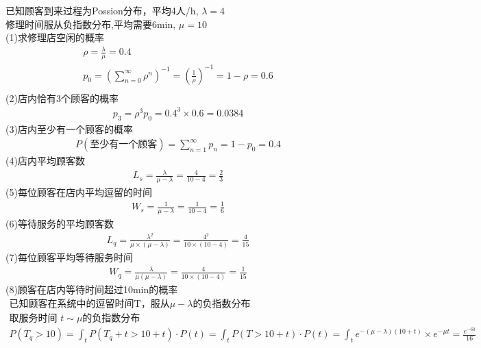 \documentclass{article}
\begin{document}
    已知顾客到来过程为Possion分布，平均4人/h, $\lambda = 4$\\
    修理时间服从负指数分布,平均需要6min, $\mu = 10$\\
    (1)求修理店空闲的概率\\
    \begin{gather*}
        \rho = \frac{\lambda}{\mu} = 0.4\\
        p_0 = \left(\sum_{n=0}^\infty \rho^n\right)^{-1} 
    = \left(\frac{1}{\rho}\right)^{-1}
    = 1-\rho = 0.6\\
    \end{gather*}
    (2)店内恰有3个顾客的概率\\
    \begin{gather*}
        p_3 = \rho^3 p_0 = 0.4^3 \times 0.6 = 0.0384
    \end{gather*}
    (3)店内至少有一个顾客的概率\\
    \begin{gather*}
        P(\text{至少有一个顾客})= \sum_{n=1}^{\infty} p_n = 1- p_0 = 0.4
    \end{gather*}
    (4)店内平均顾客数\\
    \begin{gather*}
        L_s = \frac{\lambda}{\mu - \lambda}
    = \frac{4}{10 - 4} = \frac{2}{3} 
    \end{gather*}
    (5)每位顾客在店内平均逗留的时间\\
    \begin{gather*}
        W_s = \frac{1}{\mu - \lambda}
    = \frac{1}{10 - 4} = \frac{1}{6}
    \end{gather*}
    (6)等待服务的平均顾客数\\
    \begin{gather*}
        L_q = \frac{\lambda ^2}{\mu \times (\mu - \lambda)}
    = \frac{4^2}{10 \times (10 - 4)}
    = \frac{4}{15}
    \end{gather*}
    (7)每位顾客平均等待服务时间\\
    \begin{gather*}
        W_q = \frac{\lambda}{\mu(\mu - \lambda)}
    = \frac{4}{10 \times (10 - 4)} = \frac{1}{15}
    \end{gather*}
    (8)顾客在店内等待时间超过10min的概率\\
    \begin{gather*}
        \text{已知顾客在系统中的逗留时间T，服从$\mu-\lambda$的负指数分布}\\
        \text{取服务时间 $t \sim \mu $的负指数分布}\\
        P(T_q > 10) = \int_t P(T_q + t > 10 + t) \cdot P(t) 
    = \int_t P(T > 10 + t) \cdot P(t)
    = \int_t e^{-(\mu-\lambda)(10+t)} \times e^{-\mu t}
    = \frac{e^{-60}}{16}                            
    \end{gather*}
\end{document}
